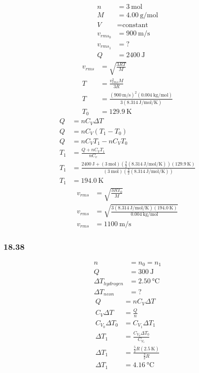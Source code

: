 \documentclass{article}
\begin{document}
\begin{align*}
	n & = \SI{3}{\mole} \\
	M & = \SI{4.00}{\gram \per \mole} \\
	V & = \text{constant} \\
	v_{rms_0} & = \SI{900}{\meter \per \second} \\
	v_{rms_1} & = ? \\
	Q & = \SI{2400}{\joule}
\end{align*}
\begin{align*}
	v_{rms} & = \sqrt{ \frac{ 3RT }{ M } } \\
	T & = \frac{ v_{rms}^2M }{ 3R } \\
	T & = \frac{ (\SI{900}{\meter \per \second})^2(\SI{0.004}{\kilogram \per \mole}) }{ 3(\SI{8.314}{\joule \per \mole \per \kelvin}) } \\
	T_0 & = \SI{129.9}{\kelvin}
\end{align*}
\begin{align*}
	Q & = nC_{V}\Delta T \\
	Q & = nC_{V}(T_1 - T_0) \\
	Q & = nC_{V}T_1 - nC_{V}T_0 \\
	T_1 & = \frac{ Q + nC_{V}T_1 }{ nC_{v} } \\
	T_1 & = \frac{ \SI{2400}{\joule} + (\SI{3}{\mole}) \left( \frac{3}{2}(\SI{8.314}{\joule \per \mole \per \kelvin}) \right) (\SI{129.9}{\kelvin}) }{ (\SI{3}{\mole}) \left( \frac{3}{2}(\SI{8.314}{\joule \per \mole \per \kelvin}) \right) } \\
	T_1 & = \SI{194.0}{\kelvin}
\end{align*}
\begin{align*}
	v_{rms} & = \sqrt{ \frac{ 3RT_0 }{ M } } \\
	v_{rms} & = \sqrt{ \frac{ 3(\SI{8.314}{\joule \per \mole \per \kelvin})(\SI{194.0}{\kelvin}) }{ \SI{0.004}{\kilogram \per \mole} } } \\
	v_{rms} & = \SI{1100}{\meter \per \second}
\end{align*}

\subsubsection{18.38}

\begin{align*}
	n & = n_0 = n_1 \\
	Q & = \SI{300}{\joule} \\
	\Delta T_{hydrogen} & = \SI{2.50}{\celsius} \\
	\Delta T_{neon} & = ?
\end{align*}
\begin{align*}
	Q & = nC_{V}\Delta T \\
	C_{V}\Delta T & = \frac{ Q }{ n } \\
	C_{V_0}\Delta T_0 & = C_{V_1}\Delta T_1 \\
	\Delta T_1 & = \frac{ C_{V_0}\Delta T_0 }{ C_{V_1} } \\
	\Delta T_1 & = \frac{ \frac{5}{2}R(\SI{2.5}{\kelvin}) }{ \frac{3}{2}R } \\
	\Delta T_1 & = \SI{4.16}{\celsius}
\end{align*}
\end{document}
